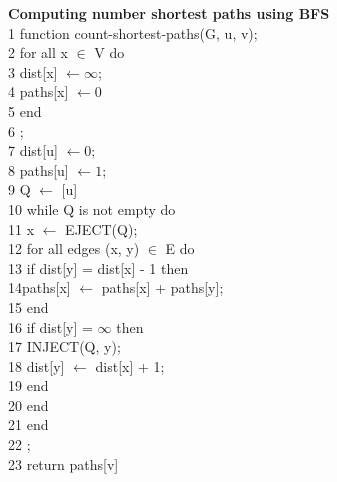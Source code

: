 \documentclass{article}
\begin{document}
\noindent \textbf{Computing number shortest paths using BFS} \\
1 function count-shortest-paths(G, u, v); \\
2 for all x $\in$ V do \\
3 \indent dist[x] $\leftarrow \infty$; \\
4 \indent paths[x] $\leftarrow 0$ \\
5 end \\
6 ; \\
7 dist[u] $\leftarrow 0$; \\
8 paths[u] $\leftarrow 1$; \\
9 Q $\leftarrow$ [u]\\
10 while Q is not empty do \\
11 \indent x $\leftarrow$ EJECT(Q); \\
12 \indent for all edges (x, y) $\in$ E do \\
13 \indent \indent if dist[y] = dist[x] - 1 then \\
14\indent \indent \indent paths[x] $\leftarrow$ paths[x] + paths[y]; \\
15 \indent \indent end \\
16 \indent \indent if dist[y] = $\infty$ then \\
17 \indent \indent \indent INJECT(Q, y); \\
18 \indent \indent \indent dist[y] $\leftarrow$ dist[x] + 1; \\
19 \indent \indent end \\
20 \indent end \\
21 end \\
22 ; \\
23 return paths[v] \\
\end{document}
